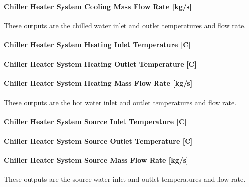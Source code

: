 \paragraph{Chiller Heater System Cooling Mass Flow Rate {[}kg/s{]}}\label{chiller-heater-system-cooling-mass-flow-rate-kgs}

These outputs are the chilled water inlet and outlet temperatures and flow rate.

\paragraph{Chiller Heater System Heating Inlet Temperature {[}C{]}}\label{chiller-heater-system-heating-inlet-temperature-c}

\paragraph{Chiller Heater System Heating Outlet Temperature {[}C{]}}\label{chiller-heater-system-heating-outlet-temperature-c}

\paragraph{Chiller Heater System Heating Mass Flow Rate {[}kg/s{]}}\label{chiller-heater-system-heating-mass-flow-rate-kgs}

These outputs are the hot water inlet and outlet temperatures and flow rate.

\paragraph{Chiller Heater System Source Inlet Temperature {[}C{]}}\label{chiller-heater-system-source-inlet-temperature-c}

\paragraph{Chiller Heater System Source Outlet Temperature {[}C{]}}\label{chiller-heater-system-source-outlet-temperature-c}

\paragraph{Chiller Heater System Source Mass Flow Rate {[}kg/s{]}}\label{chiller-heater-system-source-mass-flow-rate-kgs}

These outputs are the source water inlet and outlet temperatures and flow rate.

